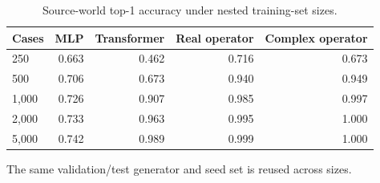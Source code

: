 \begin{table}[t]
\centering
\caption{Source-world top-1 accuracy under nested training-set sizes.}
\label{tab:sample_efficiency}
\begin{tabular}{lrrrr}
\toprule
Cases & MLP & Transformer & Real operator & Complex operator \\
\midrule
250 & 0.663 & 0.462 & 0.716 & 0.673 \\
500 & 0.706 & 0.673 & 0.940 & 0.949 \\
1,000 & 0.726 & 0.907 & 0.985 & 0.997 \\
2,000 & 0.733 & 0.963 & 0.995 & 1.000 \\
5,000 & 0.742 & 0.989 & 0.999 & 1.000 \\
\bottomrule
\end{tabular}
\begin{minipage}{0.96\linewidth}\footnotesize The same validation/test generator and seed set is reused across sizes.\end{minipage}
\end{table}
